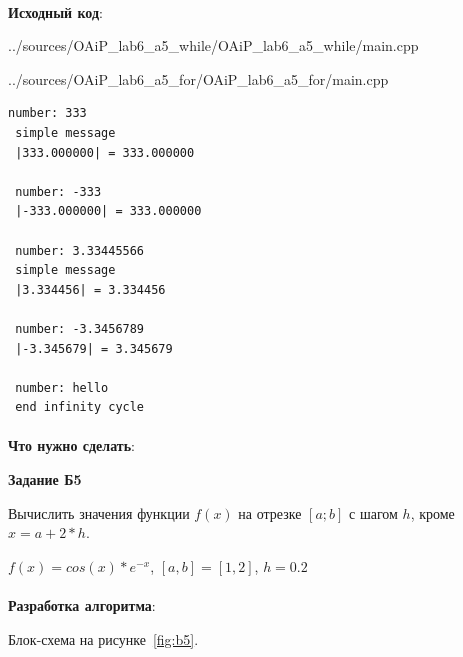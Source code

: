 \documentclass[12pt, a4paper, simple]{eskdtext}
\begin{document}
\paragraph{} \textbf{Исходный код}: 


{../sources/OAiP_lab6_a5_while/OAiP_lab6_a5_while/main.cpp}


{../sources/OAiP_lab6_a5_for/OAiP_lab6_a5_for/main.cpp}

\newpage

\begin{lstlisting}[name=Вывод в консоль]
 number: 333
 simple message
 |333.000000| = 333.000000
 
 number: -333
 |-333.000000| = 333.000000 
 
 number: 3.33445566
 simple message
 |3.334456| = 3.334456
 
 number: -3.3456789
 |-3.345679| = 3.345679
 
 number: hello
 end infinity cycle
\end{lstlisting}

\paragraph{} \textbf{Что нужно сделать}:

\begin{center}
    \textbf{Задание Б5}
\end{center}

Вычислить значения функции $f(x)$ на отрезке $[a;b]$ с шагом $h$, кроме $x = a + 2*h$.

$f(x) = cos(x) * e^{-x}$, $[a,b] = [1,2]$, $h = 0.2$

\paragraph{} \textbf{Разработка алгоритма}:

Блок-схема на рисунке~\ref{fig:b5}.
\end{document}
